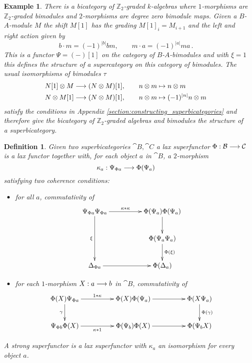 \documentclass[english,letter paper,12pt,leqno]{article}
\theoremstyle{example}
\newtheorem{definition}[theorem]{Definition}
\newtheorem{example}[theorem]{Example}
\numberwithin{equation}{section}
\begin{document}
\begin{example}\label{example:bicategory_m} There is a bicategory of $\mathbb{Z}_2$-graded $k$-algebras where $1$-morphisms are $\mathbb{Z}_2$-graded bimodules and $2$-morphisms are degree zero bimodule maps. Given a $B$-$A$-module $M$ the shift $M[1]$ has the grading $M[1]_i = M_{i+1}$ and the left and right action given by
\[
b \cdot m = (-1)^{|b|} bm, \qquad m \cdot a = (-1)^{|a|} m a\,.
\]
This is a functor $\Psi = (-)[1]$ on the category of $B$-$A$-bimodules and with $\xi = 1$ this defines the structure of a supercategory on this category of bimodules. The usual isomorphisms of bimodules $\tau$
\begin{align}
N[1] \otimes M &\longrightarrow (N \otimes M)[1], \qquad n \otimes m \mapsto n \otimes m \label{eq:shift_iso_a}\\
N \otimes M[1] &\longrightarrow (N \otimes M)[1], \qquad n \otimes m \mapsto (-1)^{|n|} n \otimes m\label{eq:shift_iso_b}
\end{align}
satisfy the conditions in Appendix \ref{section:constructing_superbicategories} and therefore give the bicategory of $\mathbb{Z}_2$-graded algebras and bimodules the structure of a superbicategory.
\end{example}

\begin{definition}\label{defn:laxsuperfunctor} Given two superbicategories $\cat{B}, \cat{C}$ a \emph{lax superfunctor} $\Phi: \mathcal{B} \longrightarrow \mathcal{C}$ is a lax functor together with, for each object $a$ in $\cat{B}$, a $2$-morphism
\[
\kappa_a: \Psi_{\Phi a} \longrightarrow \Phi( \Psi_a )
\]
satisfying two coherence conditions:
\begin{itemize}
\item[(a)] for all $a$, commutativity of
\[
\xymatrix@C+2pc{
\Psi_{\Phi a} \Psi_{\Phi a} \ar[dd]_-{\xi}\ar[r]^-{\kappa * \kappa} & \Phi( \Psi_a ) \Phi( \Psi_a ) \ar[d]\\
& \Phi( \Psi_a \Psi_a ) \ar[d]^-{\Phi(\xi)}\\
\Delta_{\Phi a} \ar[r] & \Phi( \Delta_a )
}
\]
\item[(b)] for each $1$-morphism $X: a \longrightarrow b$ in $\cat{B}$, commutativity of
\[
\xymatrix@C+2pc{
\Phi(X) \Psi_{\Phi a} \ar[d]_-{\gamma} \ar[r]^-{1 * \kappa} & \Phi(X) \Phi(\Psi_a) \ar[r] & \Phi( X \Psi_a ) \ar[d]^-{\Phi(\gamma)}\\
\Psi_{\Phi b} \Phi(X) \ar[r]_-{\kappa * 1} & \Phi(\Psi_b) \Phi(X) \ar[r] & \Phi( \Psi_b X)
}
\]
\end{itemize}
A \emph{strong superfunctor} is a lax superfunctor with $\kappa_a$ an isomorphism for every object $a$.
\end{definition}
\end{document}
